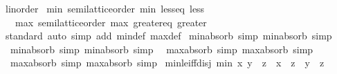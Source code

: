 \begin{isabellebody}
\endisatagproof
{\isafoldproof}%
%
\isadelimproof
\isanewline
%
\endisadelimproof
\isanewline
{}\isamarkupfalse%
%
\isadelimdocument
%
\endisadelimdocument
%
\isatagdocument
%
\isamarkuptrue%
%
\endisatagdocument
{\isafolddocument}%
%
\isadelimdocument
%
\endisadelimdocument
{}\isamarkupfalse%
\ linorder\isanewline
{}\isanewline
\isanewline
{}\isamarkupfalse%
\ min{\isacharcolon}{\kern0pt}\ semilattice{\isacharunderscore}{\kern0pt}order\ min\ less{\isacharunderscore}{\kern0pt}eq\ less\isanewline
\ \ {\isacharplus}{\kern0pt}\ max{\isacharcolon}{\kern0pt}\ semilattice{\isacharunderscore}{\kern0pt}order\ max\ greater{\isacharunderscore}{\kern0pt}eq\ greater\isanewline
%
\isadelimproof
\ \ %
\endisadelimproof
%
\isatagproof
{}\isamarkupfalse%
\ standard\ {\isacharparenleft}{\kern0pt}auto\ simp\ add{\isacharcolon}{\kern0pt}\ min{\isacharunderscore}{\kern0pt}def\ max{\isacharunderscore}{\kern0pt}def{\isacharparenright}{\kern0pt}%
\endisatagproof
{\isafoldproof}%
%
\isadelimproof
\isanewline
%
\endisadelimproof
\isanewline
{}\isamarkupfalse%
\ min{\isachardot}{\kern0pt}absorb{}\ {\isacharbrackleft}{\kern0pt}simp{\isacharbrackright}{\kern0pt}\ min{\isachardot}{\kern0pt}absorb{}\ {\isacharbrackleft}{\kern0pt}simp{\isacharbrackright}{\kern0pt}\isanewline
\ \ min{\isachardot}{\kern0pt}absorb{}\ {\isacharbrackleft}{\kern0pt}simp{\isacharbrackright}{\kern0pt}\ min{\isachardot}{\kern0pt}absorb{}\ {\isacharbrackleft}{\kern0pt}simp{\isacharbrackright}{\kern0pt}\isanewline
\ \ max{\isachardot}{\kern0pt}absorb{}\ {\isacharbrackleft}{\kern0pt}simp{\isacharbrackright}{\kern0pt}\ max{\isachardot}{\kern0pt}absorb{}\ {\isacharbrackleft}{\kern0pt}simp{\isacharbrackright}{\kern0pt}\isanewline
\ \ max{\isachardot}{\kern0pt}absorb{}\ {\isacharbrackleft}{\kern0pt}simp{\isacharbrackright}{\kern0pt}\ max{\isachardot}{\kern0pt}absorb{}\ {\isacharbrackleft}{\kern0pt}simp{\isacharbrackright}{\kern0pt}\isanewline
\isanewline
{}\isamarkupfalse%
\ min{\isacharunderscore}{\kern0pt}le{\isacharunderscore}{\kern0pt}iff{\isacharunderscore}{\kern0pt}disj{\isacharcolon}{\kern0pt}\ {\isachardoublequoteopen}min\ x\ y\ {\isasymle}\ z\ {\isasymlongleftrightarrow}\ x\ {\isasymle}\ z\ {\isasymor}\ y\ {\isasymle}\ z{\isachardoublequoteclose}\isanewline
%
\isadelimproof
\ \ %
\endisadelimproof
%
\isatagproof
{}\isamarkupfalse%

\end{isabellebody}
